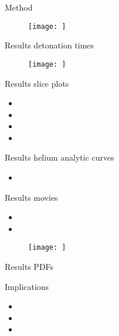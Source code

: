 \documentclass[uncompress,aspectratio=43]{beamer}  %
\begin{document}
\begin{frame}{Method}
  \begin{figure}
    \begin{center}
      \texttt{[image: ]}
    \end{center}
  \end{figure}
\end{frame}

\begin{frame}{Results}
detonation times    
\begin{figure}
    \begin{center}
      \texttt{[image: ]}
    \end{center}
  \end{figure}
\end{frame}

\begin{frame}{Results}
  slice plots
  \begin{itemize}
  \item 
  \item
   \item
  \item
  \end{itemize}

\end{frame}

\begin{frame}{Results}
  helium analytic curves
  \begin{itemize}
      \item 
      \end{itemize}
\end{frame}

\begin{frame}{Results}
  movies
  \begin{itemize}
    \item
    \item
    \end{itemize}
    \begin{figure}
    \begin{center}
      \texttt{[image: ]}
    \end{center}
  \end{figure}
\end{frame}

\begin{frame}{Results}
	PDFs
\end{frame}

\begin{frame}{Implications}
  \begin{itemize}
  \item
  \item
  \item
  \end{itemize}
  \end{frame}
\end{document}
